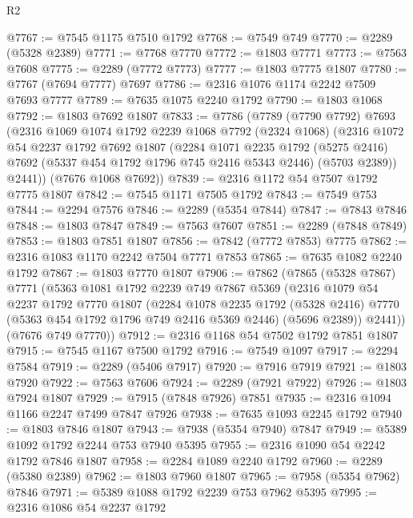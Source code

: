 \begin{lexlean}{R2}
\begin{coremodule}
@7767 := @7545 @1175 @7510 @1792
@7768 := @7549 @749
@7770 := @2289 (@5328 @2389)
@7771 := @7768 @7770
@7772 := @1803 @7771
@7773 := @7563 @7608
@7775 := @2289 (@7772 @7773)
@7777 := @1803 @7775 @1807
@7780 := @7767 (@7694 @7777) @7697
@7786 := @2316 @1076 @1174 @2242 @7509 @7693 @7777
@7789 := @7635 @1075 @2240 @1792
@7790 := @1803 @1068
@7792 := @1803 @7692 @1807
@7833 := @7786
    (@7789
      (@7790 @7792)
      @7693
      (@2316
        @1069
        @1074
        @1792
        @2239
        @1068
        @7792
        (@2324 @1068)
        (@2316
          @1072
          @54
          @2237
          @1792
          @7692
          @1807
          (@2284
            @1071
            @2235
            @1792
            (@5275 @2416)
            @7692
            (@5337 @454 @1792 @1796 @745 @2416 @5343 @2446)
            (@5703 @2389))
          @2441))
      (@7676 @1068 @7692))
@7839 := @2316 @1172 @54 @7507 @1792 @7775 @1807
@7842 := @7545 @1171 @7505 @1792
@7843 := @7549 @753
@7844 := @2294 @7576
@7846 := @2289 (@5354 @7844)
@7847 := @7843 @7846
@7848 := @1803 @7847
@7849 := @7563 @7607
@7851 := @2289 (@7848 @7849)
@7853 := @1803 @7851 @1807
@7856 := @7842 (@7772 @7853) @7775
@7862 := @2316 @1083 @1170 @2242 @7504 @7771 @7853
@7865 := @7635 @1082 @2240 @1792
@7867 := @1803 @7770 @1807
@7906 := @7862
    (@7865
      (@5328 @7867)
      @7771
      (@5363
        @1081
        @1792
        @2239
        @749
        @7867
        @5369
        (@2316
          @1079
          @54
          @2237
          @1792
          @7770
          @1807
          (@2284
            @1078
            @2235
            @1792
            (@5328 @2416)
            @7770
            (@5363 @454 @1792 @1796 @749 @2416 @5369 @2446)
            (@5696 @2389))
          @2441))
      (@7676 @749 @7770))
@7912 := @2316 @1168 @54 @7502 @1792 @7851 @1807
@7915 := @7545 @1167 @7500 @1792
@7916 := @7549 @1097
@7917 := @2294 @7584
@7919 := @2289 (@5406 @7917)
@7920 := @7916 @7919
@7921 := @1803 @7920
@7922 := @7563 @7606
@7924 := @2289 (@7921 @7922)
@7926 := @1803 @7924 @1807
@7929 := @7915 (@7848 @7926) @7851
@7935 := @2316 @1094 @1166 @2247 @7499 @7847 @7926
@7938 := @7635 @1093 @2245 @1792
@7940 := @1803 @7846 @1807
@7943 := @7938 (@5354 @7940) @7847
@7949 := @5389 @1092 @1792 @2244 @753 @7940 @5395
@7955 := @2316 @1090 @54 @2242 @1792 @7846 @1807
@7958 := @2284 @1089 @2240 @1792
@7960 := @2289 (@5380 @2389)
@7962 := @1803 @7960 @1807
@7965 := @7958 (@5354 @7962) @7846
@7971 := @5389 @1088 @1792 @2239 @753 @7962 @5395
@7995 := @2316
    @1086
    @54
    @2237
    @1792

\end{coremodule}
\end{lexlean}
